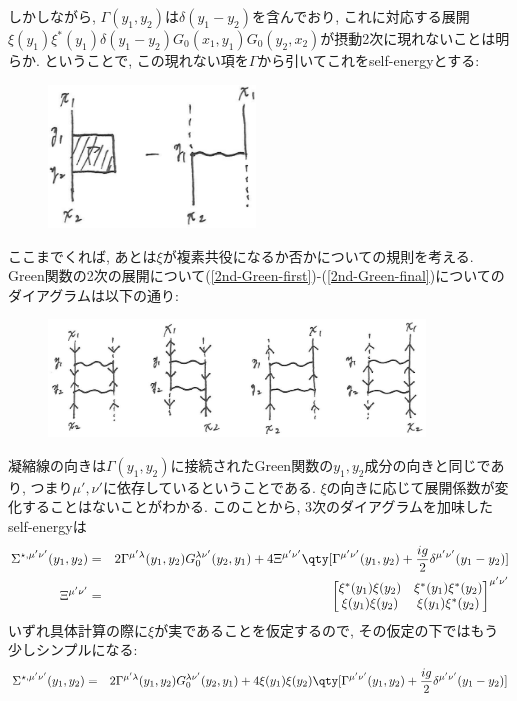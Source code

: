 \documentclass[10.5pt,a4paper]{jreport}
\begin{document}
しかしながら, $\Gamma(y_1, y_2)$は$\delta(y_1 - y_2)$を含んでおり, これに対応する展開$\xi(y_1)\xi^*(y_1)\delta(y_1 - y_2)G_0(x_1, y_1)G_0(y_2, x_2)$が摂動2次に現れないことは明らか. ということで, この現れない項を$\Gamma$から引いてこれをself-energyとする:
\begin{figure}[H]
  \begin{center}
    \includegraphics[width = 5.5cm]{./EPS/ladder3-4.eps}
  \end{center}
\end{figure}
ここまでくれば, あとは$\xi$が複素共役になるか否かについての規則を考える. Green関数の2次の展開について(\ref{2nd-Green-first})-(\ref{2nd-Green-final})についてのダイアグラムは以下の通り:
\begin{figure}[H]
  \begin{center}
    \includegraphics[width = 10cm]{./EPS/ladder3-3.eps}
  \end{center}
\end{figure}
凝縮線の向きは$\Gamma(y_1, y_2)$に接続されたGreen関数の$y_1, y_2$成分の向きと同じであり, つまり$\mu', \nu'$に依存しているということである. $\xi$の向きに応じて展開係数が変化することはないことがわかる. このことから, 3次のダイアグラムを加味したself-energyは
\begin{eqnarray}
  \Sigma^{\star, \mu'\nu'}(y_1, y_2) &=& 2\Gamma^{\mu'\lambda}(y_1, y_2)G_0^{\lambda\nu'}(y_2, y_1) + 4\Xi^{\mu'\nu'}\qty[\Gamma^{\mu'\nu'}(y_1, y_2) + \frac{ig}{2}\delta^{\mu'\nu'}(y_1 - y_2)]\\
  \Xi^{\mu'\nu'}&=&
    \begin{bmatrix}
      \xi^*(y_1)\xi(y_2)&\xi^*(y_1)\xi^*(y_2)\\
    \xi(y_1)\xi(y_2)&\xi(y_1)\xi^*(y_2)
  \end{bmatrix}^{\mu'\nu'}
\end{eqnarray}
いずれ具体計算の際に$\xi$が実であることを仮定するので, その仮定の下ではもう少しシンプルになる:
\begin{eqnarray}
  \Sigma^{\star, \mu'\nu'}(y_1, y_2) &=& 2\Gamma^{\mu'\lambda}(y_1, y_2)G_0^{\lambda\nu'}(y_2, y_1) + 4\xi(y_1)\xi(y_2)\qty[\Gamma^{\mu'\nu'}(y_1, y_2) + \frac{ig}{2}\delta^{\mu'\nu'}(y_1 - y_2)]
\end{eqnarray}
\end{document}
